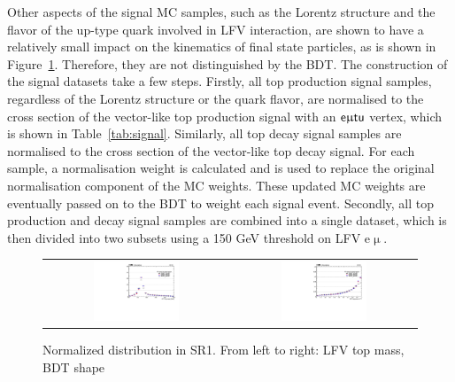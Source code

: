 Other aspects of the signal \ac{MC} samples, such as the Lorentz structure and the flavor of the up-type quark involved in LFV interaction, are shown to have a relatively small impact on the kinematics of final state particles, as is shown in Figure~\ref{fig:Lorentz}. Therefore, they are not distinguished by the \ac{BDT}. The construction of the signal datasets take a few steps. Firstly, all top production signal samples, regardless of the Lorentz structure or the quark flavor, are normalised to the cross section of the vector-like top production signal with an $\textsf{e}\upmu\textsf{t{u}}$ vertex, which is shown in Table~\ref{tab:signal}. Similarly, all top decay signal samples are normalised to the cross section of the vector-like top decay signal. For each sample, a normalisation weight is calculated and is used to replace the original normalisation component of the \ac{MC} weights. These updated \ac{MC} weights are eventually passed on to the \ac{BDT} to weight each signal event.  Secondly, all top production and decay signal samples are combined into a single dataset, which is then divided into two subsets using a 150 GeV threshold on LFV e$\upmu$. 

\begin{figure}[tbh!]
 \begin{center}
 \begin{tabular}{cc}
  \includegraphics[width=0.48\textwidth]{figures/Part3/BDT/LFV_VR_emul_lllOffZMetg20Jetgeq1Bleq1_LFVTopmass_N}&
    \includegraphics[width=0.48\textwidth]{figures/Part3/BDT/LFV_VR_emul_lllOffZMetg20Jetgeq1Bleq1_BDT_TT_N}\\
 \end{tabular}
 \caption{Normalized distribution in SR1. From left to right: LFV top mass, BDT shape}
 \label{fig:Lorentz}
 \end{center}
\end{figure}

